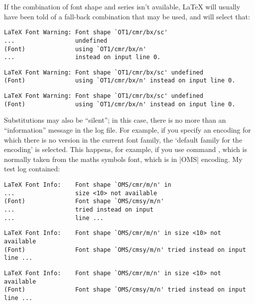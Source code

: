 {If the combination of font shape and series isn't available, \LaTeX{}
will usually have been told of a fall-back combination that may be
used, and will select that:
\htmlignore
\begin{dviversion}
\begin{verbatim}
LaTeX Font Warning: Font shape `OT1/cmr/bx/sc'
...                 undefined
(Font)              using `OT1/cmr/bx/n'
...                 instead on input line 0.
\end{verbatim}
\end{dviversion}
\begin{pdfversion}
\begin{verbatim}
LaTeX Font Warning: Font shape `OT1/cmr/bx/sc' undefined
(Font)              using `OT1/cmr/bx/n' instead on input line 0.
\end{verbatim}
\end{pdfversion}
\endhtmlignore
\begin{htmlversion}
\begin{verbatim}
LaTeX Font Warning: Font shape `OT1/cmr/bx/sc' undefined
(Font)              using `OT1/cmr/bx/n' instead on input line 0.
\end{verbatim}
\end{htmlversion}

Substitutions may also be ``silent''; in this case, there is no more
than an ``information'' message in the log file.  For example, if you
specify an encoding for which there is no version in the current font
family, the `default family for the encoding' is selected.  This
happens, for example, if you use command , which is
normally taken from the maths symbols font, which is in |OMS|
encoding.  My test log contained:
\htmlignore
\begin{dviversion}
\begin{verbatim}
LaTeX Font Info:    Font shape `OMS/cmr/m/n' in
...                 size <10> not available
(Font)              Font shape `OMS/cmsy/m/n'
...                 tried instead on input
...                 line ...
\end{verbatim}
\end{dviversion}
\begin{pdfversion}
\begin{verbatim}
LaTeX Font Info:    Font shape `OMS/cmr/m/n' in size <10> not available
(Font)              Font shape `OMS/cmsy/m/n' tried instead on input line ...
\end{verbatim}
\end{pdfversion}
\endhtmlignore
\begin{htmlversion}
\begin{verbatim}
LaTeX Font Info:    Font shape `OMS/cmr/m/n' in size <10> not available
(Font)              Font shape `OMS/cmsy/m/n' tried instead on input line ...
\end{verbatim}
\end{htmlversion}

}
